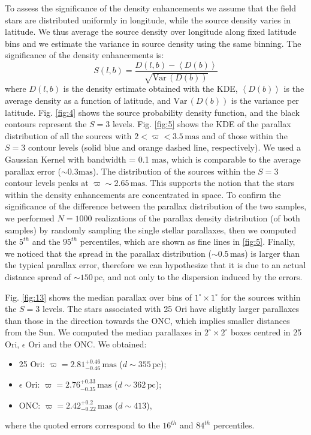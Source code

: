\documentclass[twocolumn]{aa}
\begin{document}
To assess the significance of the density enhancements we assume that the field stars are distributed uniformly in longitude, while the source density varies in latitude. We thus average the source density over longitude along fixed latitude bins and we estimate the variance in source density using the same binning. The significance of the density enhancements is:
\begin{equation}
S(l, b) = \frac{ D(l, b) - \left\langle D(b) \right\rangle}{\sqrt{\mathrm{Var} \,(D(b))}}
\end{equation}
where $D(l, b)$ is the density estimate obtained with the KDE, $\left\langle D(b) \right\rangle$ is the average density as a function of latitude, and $\mathrm{Var}\,(D(b))$ is the variance per latitude. Fig. \ref{fig:4} shows the source probability density function, and the black contours represent the $S = 3$ levels. 
Fig. \ref{fig:5} shows the KDE of the parallax distribution
of all the sources with $2 < \varpi < 3.5 \, \mathrm{mas}$ and of those within the $S = 3$ contour levels (solid blue and orange dashed line, respectively). We used a Gaussian Kernel with bandwidth = 0.1 $\mathrm{mas}$, which is comparable to the average parallax error ($\sim 0.3 \mathrm{mas}$).
The distribution of the sources within the $S=3$ contour levels peaks at  $\varpi \sim 2.65 \, \mathrm{mas}$. This supports the notion that the stars within the density enhancements are concentrated in space.
To confirm the significance of the difference between the parallax distribution of the two samples, we performed $N = 1000$ realizations of the parallax density distribution (of both samples) by randomly sampling the single stellar parallaxes, then we computed  the $5^{th}$ and the $95^{th}$ percentiles, which are shown as fine lines in \ref{fig:5}.
Finally, we noticed that the spread in the parallax distribution ($\sim 0.5 \, \mathrm{mas}$) is larger than the typical parallax error, therefore we can hypothesize that it is due to an actual distance spread of $\sim 150 \, \mathrm{pc}$, and not only to the dispersion induced by the errors.

Fig. \ref{fig:13} shows the median parallax over bins of $1^{\circ} \times 1^{\circ}$ for the sources within the $S = 3$ levels.
The stars associated with 25 Ori have slightly larger parallaxes than those in the direction towards the ONC, which implies smaller distances from the Sun. We computed the median parallaxes in $2^{\circ}\times 2^{\circ}$ boxes centred in 25 Ori, $\epsilon$ Ori and the ONC. We obtained:
\begin{itemize}
\item 25 Ori: $\varpi = 2.81^{+0.46}_{-0.46} \,  \mathrm{mas}$  ($d \sim 355 \, \mathrm{pc}$);
\item $\epsilon$ Ori: $\varpi = 2.76^{+0.33}_{-0.35} \,  \mathrm{mas}$ ($d \sim 362 \, \mathrm{pc}$);
\item ONC: $\varpi = 2.42^{+0.2}_{-0.22} \,  \mathrm{mas}$ ($d \sim 413$),
\end{itemize}
where the quoted errors correspond to the $16^{th}$ and $84^{th}$ percentiles.
\end{document}
